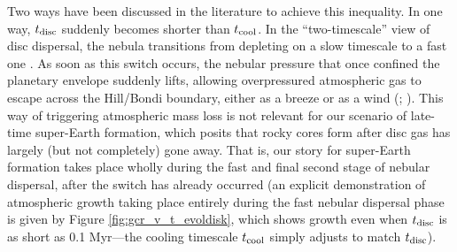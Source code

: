 \documentclass[fleqn,useAMS,usenatbib]{mnras}
\begin{document}
Two ways have been discussed
in the literature to achieve this inequality.
In one way, $t_{\rm disc}$ suddenly becomes shorter
than $t_{\rm cool}$. In the ``two-timescale'' view of disc dispersal, the
nebula transitions from depleting on a slow timescale
to a fast one \citep{clarke01,alexander14}.
As soon as this switch occurs, the nebular
pressure that once confined the planetary envelope suddenly lifts,
allowing overpressured atmospheric gas to escape across the Hill/Bondi
boundary, either as a breeze or as a wind
(\citealt{ikoma12}; \citealt{owen16}). 
This way of triggering atmospheric mass loss
is not relevant for our scenario of late-time super-Earth
formation, which posits that rocky cores form after disc gas
has largely (but not completely) gone away. That is,
our story for super-Earth formation takes place wholly during the fast and
final second stage of nebular dispersal, 
after the switch has already occurred
(an explicit demonstration of atmospheric growth taking place entirely during the fast
  nebular dispersal phase is given by Figure
  \ref{fig:gcr_v_t_evoldisk}, which shows growth even when $t_{\rm
    disc}$ is as short as 0.1 Myr---the cooling timescale $t_{\rm
    cool}$ simply adjusts to match $t_{\rm disc}$).
\end{document}
